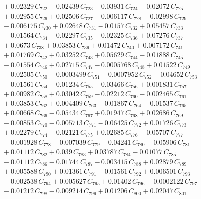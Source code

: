 \documentclass[a4paper,11pt]{article}
\begin{document}
\begin{align}
&\quad + 0.02329\,C_{722} - 0.02439\,C_{723} - 0.03931\,C_{724} - 0.02072\,C_{725} \nonumber\\
&\quad + 0.02955\,C_{726} + 0.02506\,C_{727} - 0.006117\,C_{728} - 0.02998\,C_{729} \nonumber\\
&\quad - 0.006175\,C_{730} + 0.02648\,C_{731} - 0.0157\,C_{732} + 0.05457\,C_{733} \nonumber\\
&\quad - 0.01564\,C_{734} - 0.02297\,C_{735} - 0.02325\,C_{736} + 0.07276\,C_{737} \nonumber\\
&\quad + 0.0673\,C_{738} + 0.03853\,C_{739} + 0.01472\,C_{740} + 0.007172\,C_{741} \nonumber\\
&\quad + 0.01769\,C_{742} + 0.03252\,C_{743} + 0.05629\,C_{744} - 0.01888\,C_{745} \nonumber\\
&\quad - 0.01554\,C_{746} + 0.02715\,C_{747} - 0.0005768\,C_{748} + 0.01522\,C_{749} \nonumber\\
&\quad - 0.02505\,C_{750} - 0.0003499\,C_{751} - 0.0007952\,C_{752} - 0.04652\,C_{753} \nonumber\\
&\quad - 0.01561\,C_{754} - 0.01234\,C_{755} - 0.03466\,C_{756} + 0.001831\,C_{757} \nonumber\\
&\quad + 0.00982\,C_{758} + 0.03042\,C_{759} - 0.02212\,C_{760} - 0.002465\,C_{761} \nonumber\\
&\quad + 0.03853\,C_{762} + 0.004409\,C_{763} - 0.01867\,C_{764} - 0.01537\,C_{765} \nonumber\\
&\quad + 0.00668\,C_{766} - 0.05434\,C_{767} + 0.01947\,C_{768} + 0.02686\,C_{769} \nonumber\\
&\quad - 0.00853\,C_{770} - 0.005713\,C_{771} - 0.06425\,C_{772} + 0.01726\,C_{773} \nonumber\\
&\quad + 0.02279\,C_{774} - 0.02121\,C_{775} + 0.02685\,C_{776} - 0.05707\,C_{777} \nonumber\\
&\quad - 0.001928\,C_{778} - 0.007039\,C_{779} - 0.04241\,C_{780} - 0.05906\,C_{781} \nonumber\\
&\quad + 0.01112\,C_{782} + 0.039\,C_{783} + 0.03787\,C_{784} - 0.01077\,C_{785} \nonumber\\
&\quad - 0.01112\,C_{786} - 0.01744\,C_{787} - 0.003415\,C_{788} + 0.02879\,C_{789} \nonumber\\
&\quad + 0.005588\,C_{790} + 0.01361\,C_{791} - 0.01561\,C_{792} + 0.006501\,C_{793} \nonumber\\
&\quad - 0.002538\,C_{794} + 0.005627\,C_{795} + 0.01402\,C_{796} - 0.0002122\,C_{797} \nonumber\\
&\quad - 0.01212\,C_{798} - 0.009214\,C_{799} + 0.01206\,C_{800} + 0.02047\,C_{801} \nonumber\\

\end{align}
\end{document}

